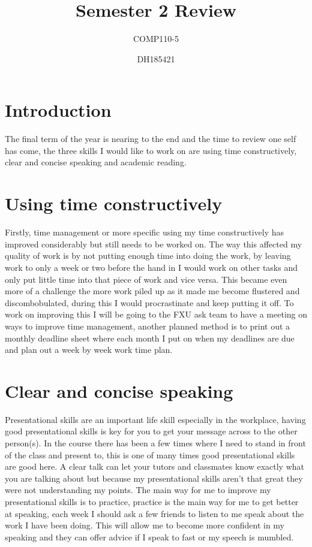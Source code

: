 \documentclass{scrartcl}
\title{Semester 2 Review}
\subtitle{COMP110-5}
\author{DH185421}
\begin{document}
\maketitle
{}
\section{Introduction}
The final term of the year is nearing to the end and the time to review one self has come, the three skills I would like to work on are using time constructively, clear and concise speaking and academic reading.
\section{Using time constructively}
Firstly, time management or more specific using my time constructively has improved considerably but still needs to be worked on. The way this affected my quality of work is by not putting enough time into doing the work, by leaving work to only a week or two before the hand in I would work on other tasks and only put little time into that piece of work and vice versa. This became even more of a challenge the more work piled up as it made me become flustered and discombobulated, during this I would procrastinate and keep putting it off. To work on improving this I will be going to the FXU ask team to have a meeting on ways to improve time management, another planned method is to print out a monthly deadline sheet where each month I put on when my deadlines are due and plan out a week by week work time plan.

\section{Clear and concise speaking}
Presentational skills are an important life skill especially in the workplace, having good presentational skills is key for you to get your message across to the other person(s). In the course there has been a few times where I need to stand in front of the class and present to, this is one of many times good presentational skills are good here. A clear talk can let your tutors and classmates know exactly what you are talking about but because my presentational skills aren't that great they were not understanding my points. The main way for me to improve my presentational skills is to practice, practice is the main way for me to get better at speaking, each week I should ask a few friends to listen to me speak about the work I have been doing. This will allow me to become more confident in my speaking and they can offer advice if I speak to fast or my speech is mumbled.
\end{document}
